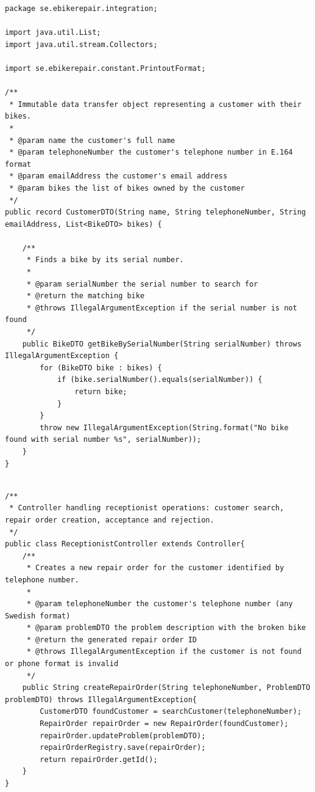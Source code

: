 \documentclass[a4paper]{scrartcl}
\begin{document}
\begin{lstlisting}[style=javastyle, caption={Main class entry point}]
package se.ebikerepair.integration;

import java.util.List;
import java.util.stream.Collectors;

import se.ebikerepair.constant.PrintoutFormat;

/**
 * Immutable data transfer object representing a customer with their bikes.
 *
 * @param name the customer's full name
 * @param telephoneNumber the customer's telephone number in E.164 format
 * @param emailAddress the customer's email address
 * @param bikes the list of bikes owned by the customer
 */
public record CustomerDTO(String name, String telephoneNumber, String emailAddress, List<BikeDTO> bikes) {

    /**
     * Finds a bike by its serial number.
     *
     * @param serialNumber the serial number to search for
     * @return the matching bike
     * @throws IllegalArgumentException if the serial number is not found
     */
    public BikeDTO getBikeBySerialNumber(String serialNumber) throws IllegalArgumentException {
        for (BikeDTO bike : bikes) {
            if (bike.serialNumber().equals(serialNumber)) {
                return bike;
            }
        }
        throw new IllegalArgumentException(String.format("No bike found with serial number %s", serialNumber));
    }
}

\end{lstlisting}

\begin{lstlisting}[style=javastyle, caption={Main class entry point}]

/**
 * Controller handling receptionist operations: customer search, repair order creation, acceptance and rejection.
 */
public class ReceptionistController extends Controller{
    /**
     * Creates a new repair order for the customer identified by telephone number.
     *
     * @param telephoneNumber the customer's telephone number (any Swedish format)
     * @param problemDTO the problem description with the broken bike
     * @return the generated repair order ID
     * @throws IllegalArgumentException if the customer is not found or phone format is invalid
     */
    public String createRepairOrder(String telephoneNumber, ProblemDTO problemDTO) throws IllegalArgumentException{
        CustomerDTO foundCustomer = searchCustomer(telephoneNumber);
        RepairOrder repairOrder = new RepairOrder(foundCustomer);
        repairOrder.updateProblem(problemDTO);
        repairOrderRegistry.save(repairOrder);
        return repairOrder.getId();
    }
}

\end{lstlisting}
\end{document}
